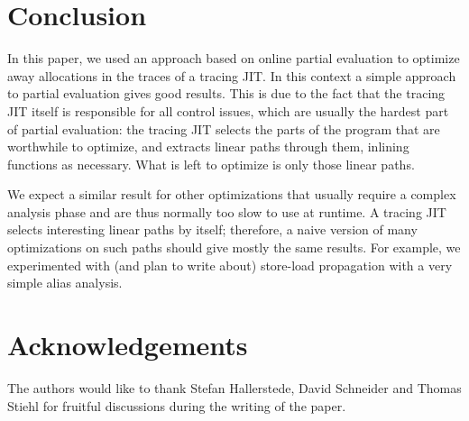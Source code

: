 \documentclass[preprint]{sigplanconf}
\begin{document}
\section{Conclusion}
\label{sec:conclusion}

In this paper, we used an approach based on online partial evaluation to
optimize away allocations in the traces of a tracing JIT.  In this context a
simple approach to partial evaluation gives good results.  This is due
to the fact that the tracing JIT itself is responsible for all control
issues, which are usually the hardest part of partial evaluation: the
tracing JIT selects the parts of the program that are worthwhile to
optimize, and extracts linear paths through them, inlining functions as
necessary.  What is left to optimize is only those linear paths.

We expect a similar result for other optimizations that usually require
a complex analysis phase and are thus normally too slow to use at
runtime.  A tracing JIT selects interesting linear paths by itself;
therefore, a naive version of many optimizations on such paths should
give mostly the same results.  For example, we experimented with (and
plan to write about) store-load propagation with a very simple alias
analysis.


\section*{Acknowledgements}

The authors would like to thank Stefan Hallerstede, David Schneider and Thomas
Stiehl for fruitful discussions during the writing of the paper.



\end{document}
